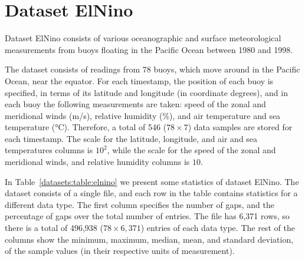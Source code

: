 
\vspace{-25pt}
\section{Dataset ElNino}
\label{datasets:elnino}

\vspace{-5pt}
Dataset ElNino \cite{dataset:elnino} consists of various oceanographic and surface meteorological measurements from buoys floating in the Pacific Ocean between 1980 and 1998. \TAODef


The dataset consists of readings from 78 buoys, which move around in the Pacific Ocean, near the equator. For each timestamp, the position of each buoy is specified, in terms of its latitude and longitude (in coordinate degrees), and in each buoy the following measurements are taken: speed of the zonal and meridional winds (m/s), relative humidity (\%), and air temperature and sea temperature (°C). Therefore, a total of 546 ($78\times7$) data samples are stored for each timestamp. The scale for the latitude, longitude, and air and sea temperatures columns is $10^2$, while the scale for the speed of the zonal and meridional winds, and relative humidity columns is $10$.


In Table~\ref{datasets:table:elnino} we present some statistics of dataset ElNino. The dataset consists of a single file, and each row in the table contains statistics for a different data type. The first column specifies the number of gaps, and the percentage of gaps over the total number of entries. The file has 6,371 rows, so there is a total of 496,938 ($78\times6,371$) entries of each data type. The rest of the columns show the minimum, maximum, median, mean, and standard deviation, of the sample values (in their respective units of measurement).




\clearpage